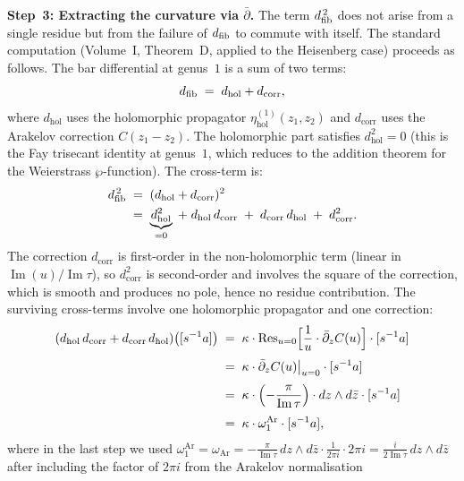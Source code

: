\begin{computation}
\smallskip\noindent
\textbf{Step~3: Extracting the curvature via $\bar\partial$.}
The term $d_{\mathrm{fib}}^{\,2}$ does not arise from a
single residue but from the failure of $d_{\mathrm{fib}}$ to commute with
itself. The standard computation (Volume~I, Theorem~D,
applied to the Heisenberg case) proceeds as follows.
The bar differential at genus~$1$ is a sum of two terms:
\[
 d_{\mathrm{fib}}
 \;=\;
 d_{\mathrm{hol}} + d_{\mathrm{corr}},
\]
where $d_{\mathrm{hol}}$ uses the holomorphic propagator
$\eta^{(1)}_{\mathrm{hol}}(z_1,z_2)$ and $d_{\mathrm{corr}}$ uses
the Arakelov correction $C(z_1-z_2)$. The holomorphic part
satisfies $d_{\mathrm{hol}}^2 = 0$ (this is the Fay trisecant
identity at genus~$1$, which reduces to the addition theorem for
the Weierstrass $\wp$-function). The cross-term is:
\begin{align}\label{eq:cross-term}
 d_{\mathrm{fib}}^{\,2}
 &\;=\;
 (d_{\mathrm{hol}} + d_{\mathrm{corr}})^2
 \notag\\
 &\;=\;
 \underbrace{d_{\mathrm{hol}}^2}_{= 0}
 \;+\;
 d_{\mathrm{hol}}\, d_{\mathrm{corr}}
 \;+\;
 d_{\mathrm{corr}}\, d_{\mathrm{hol}}
 \;+\;
 d_{\mathrm{corr}}^2.
\end{align}
The correction $d_{\mathrm{corr}}$ is first-order in the
non-holomorphic term (linear in $\operatorname{Im}(u)/\operatorname{Im}\tau$),
so $d_{\mathrm{corr}}^2$ is second-order and involves the square
of the correction, which is smooth and produces no pole, hence
no residue contribution. The surviving cross-terms involve
one holomorphic propagator and one correction:
\begin{align}\label{eq:cross-contribution}
 (d_{\mathrm{hol}}\, d_{\mathrm{corr}} +
 d_{\mathrm{corr}}\, d_{\mathrm{hol}})
 \bigl([s^{-1}a]\bigr)
 &\;=\;
 \kappa \cdot
 \operatorname{Res}_{u=0}\Bigl[
 \frac{1}{u} \cdot \bar\partial_z C(u)
 \Bigr]
 \cdot [s^{-1}a]
 \notag\\[3pt]
 &\;=\;
 \kappa \cdot \bar\partial_z C(u)\big|_{u=0}
 \cdot [s^{-1}a]
 \notag\\[3pt]
 &\;=\;
 \kappa \cdot
 \Bigl(-\frac{\pi}{\operatorname{Im}\tau}\Bigr)
 \cdot dz \wedge d\bar z
 \cdot [s^{-1}a]
 \notag\\[3pt]
 &\;=\;
 \kappa \cdot \omega_1^{\mathrm{Ar}} \cdot [s^{-1}a],
\end{align}
where in the last step we used
$\omega_1^{\mathrm{Ar}} = \omega_{\mathrm{Ar}} = -\frac{\pi}{\operatorname{Im}\tau}\,
dz \wedge d\bar z \cdot \frac{1}{2\pi i} \cdot 2\pi i =
\frac{i}{2\operatorname{Im}\tau}\, dz \wedge d\bar z$ after
including the factor of $2\pi i$ from the Arakelov normalisation

\end{computation}
